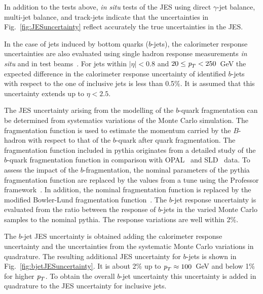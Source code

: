 In addition to the tests above, \emph{in situ} tests of the JES using direct $\gamma$-jet balance, multi-jet balance, and track-jets indicate that the uncertainties in Fig.~\ref{fig:JESuncertainty} reflect accurately the true uncertainties in the JES.  

In the case of jets induced by bottom quarks ($b$-jets), the calorimeter response uncertainties are also evaluated using single hadron response measurements \emph{in situ}  and in test beams~\cite{ATLAS-CONF-2011-028}. For jets within $|\eta|<0.8$ and $20 \leq {\emph{p}_{T}} < 250$~GeV the expected difference in the calorimeter response uncertainty of identified $b$-jets with respect to the one of inclusive jets is less than 0.5\%. It is assumed that this uncertainty extends up to $\eta < 2.5$.

The JES uncertainty arising from the modelling of the $b$-quark fragmentation can be determined from systematics variations of the Monte Carlo simulation. The fragmentation function is used to estimate the momentum carried by the $B$-hadron with respect to that of the $b$-quark after quark fragmentation.   The fragmentation function included in {\sc pythia} originates from a detailed study of the $b$-quark fragmentation function in comparison with OPAL~\cite{Abbiendi:2002vt} and SLD~\cite{Abe:2002iq} data. To assess the impact of the $b$-fragmentation, the nominal parameters of the {\sc pythia} fragmentation function are replaced by the values from a tune using the Professor framework~\cite{Professor}. In addition, the nominal fragmentation function is replaced by the modified Bowler-Lund fragmentation function~\cite{BowlerLund}. The $b$-jet response uncertainty is evaluated from the ratio between the response of $b$-jets in the varied Monte Carlo samples to the nominal {\sc pythia}. The response variations are well within 2\%.

The $b$-jet JES uncertainty is obtained adding the calorimeter response uncertainty and the uncertainties from the systematic Monte Carlo variations in quadrature. The resulting additional JES uncertainty for $b$-jets is shown in Fig.~\ref{fig:bjetJESuncertainty}. It is about 2\% up to ${\emph{p}_{T}} \approx 100$~GeV and below 1\% for higher ${\emph{p}_{T}}$. To obtain the overall $b$-jet uncertainty this uncertainty is added in quadrature to the JES uncertainty for inclusive jets.

